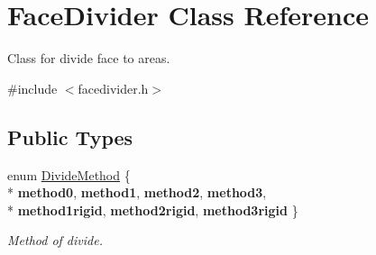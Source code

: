 \hypertarget{class_face_divider}{\section{Face\+Divider Class Reference}
\label{class_face_divider}
}


Class for divide face to areas.  




{\ttfamily \#include $<$facedivider.\+h$>$}

\subsection*{Public Types}
\begin{DoxyCompactItemize}
\item 
\hypertarget{class_face_divider_afd66ad7d2423aaa67e20a7f6cbabb6ef}{enum \hyperlink{class_face_divider_afd66ad7d2423aaa67e20a7f6cbabb6ef}{Divide\+Method} \{ \\*
{\bfseries method0}, 
{\bfseries method1}, 
{\bfseries method2}, 
{\bfseries method3}, 
\\*
{\bfseries method1rigid}, 
{\bfseries method2rigid}, 
{\bfseries method3rigid}
 \}}\label{class_face_divider_afd66ad7d2423aaa67e20a7f6cbabb6ef}

\begin{DoxyCompactList}\small\item\em Method of divide. \end{DoxyCompactList}\end{DoxyCompactItemize}
